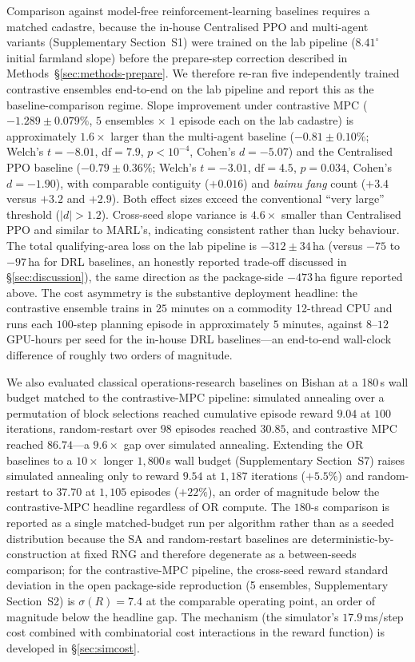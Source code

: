 \documentclass[11pt]{article}
\begin{document}
Comparison against model-free reinforcement-learning baselines requires a matched cadastre, because the in-house Centralised PPO and multi-agent variants (Supplementary Section~S1) were trained on the lab pipeline ($8.41^{\circ}$ initial farmland slope) before the prepare-step correction described in Methods~\S\ref{sec:methods-prepare}. We therefore re-ran five independently trained contrastive ensembles end-to-end on the lab pipeline and report this as the baseline-comparison regime. Slope improvement under contrastive MPC ($-1.289 \pm 0.079\%$, $5$ ensembles $\times$ $1$ episode each on the lab cadastre) is approximately $1.6\times$ larger than the multi-agent baseline ($-0.81 \pm 0.10\%$; Welch's $t = -8.01$, $\mathrm{df}{=}7.9$, $p < 10^{-4}$, Cohen's $d = -5.07$) and the Centralised PPO baseline ($-0.79 \pm 0.36\%$; Welch's $t = -3.01$, $\mathrm{df}{=}4.5$, $p = 0.034$, Cohen's $d = -1.90$), with comparable contiguity ($+0.016$) and \textit{baimu fang} count ($+3.4$ versus $+3.2$ and $+2.9$). Both effect sizes exceed the conventional ``very large'' threshold ($|d| > 1.2$). Cross-seed slope variance is $4.6\times$ smaller than Centralised PPO and similar to MARL's, indicating consistent rather than lucky behaviour. The total qualifying-area loss on the lab pipeline is $-312 \pm 34$\,ha (versus $-75$ to $-97$\,ha for DRL baselines, an honestly reported trade-off discussed in \S\ref{sec:discussion}), the same direction as the package-side $-473$\,ha figure reported above. The cost asymmetry is the substantive deployment headline: the contrastive ensemble trains in $25$ minutes on a commodity 12-thread CPU and runs each $100$-step planning episode in approximately $5$ minutes, against $8$--$12$ GPU-hours per seed for the in-house DRL baselines---an end-to-end wall-clock difference of roughly two orders of magnitude.

We also evaluated classical operations-research baselines on Bishan at a 180\,s wall budget matched to the contrastive-MPC pipeline: simulated annealing over a permutation of block selections reached cumulative episode reward $9.04$ at $100$ iterations, random-restart over $98$ episodes reached $30.85$, and contrastive MPC reached $86.74$---a $9.6\times$ gap over simulated annealing. Extending the OR baselines to a $10\times$ longer $1{,}800$\,s wall budget (Supplementary Section~S7) raises simulated annealing only to reward $9.54$ at $1{,}187$ iterations ($+5.5\%$) and random-restart to $37.70$ at $1{,}105$ episodes ($+22\%$), an order of magnitude below the contrastive-MPC headline regardless of OR compute. The $180$-s comparison is reported as a single matched-budget run per algorithm rather than as a seeded distribution because the SA and random-restart baselines are deterministic-by-construction at fixed RNG and therefore degenerate as a between-seeds comparison; for the contrastive-MPC pipeline, the cross-seed reward standard deviation in the open package-side reproduction (5 ensembles, Supplementary Section~S2) is $\sigma(R) = 7.4$ at the comparable operating point, an order of magnitude below the headline gap. The mechanism (the simulator's $17.9$\,ms/step cost combined with combinatorial cost interactions in the reward function) is developed in \S\ref{sec:simcost}.
\end{document}
